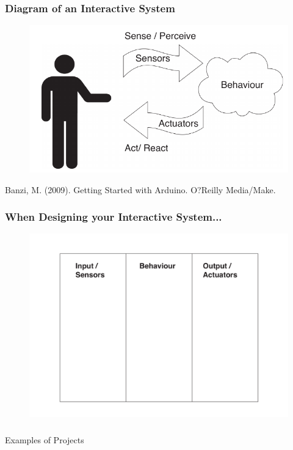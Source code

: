 \documentclass[screen, aspectratio=169]{beamer}
\begin{document}
\begin{frame}
\frametitle{Diagram of an Interactive System}
       \begin{figure}
	\includegraphics[scale=0.65]{img/Diagram-Banzi.pdf}
	\end{figure}
{\tiny
Banzi, M. (2009). Getting Started with Arduino. O?Reilly Media/Make.  \cite{Banzi.2009.arduino}
}	
\end{frame}
%
\begin{frame}
\frametitle{When Designing your Interactive System...}
       \begin{figure}
	\includegraphics[scale=0.35]{img/diagram-physical-computing-system.pdf}
	\end{figure}
\end{frame}
%
\usebackgroundtemplate{}
\begin{frame}
\frametitle{}
{\huge Examples of Projects}
\end{frame}
%
\end{document}
